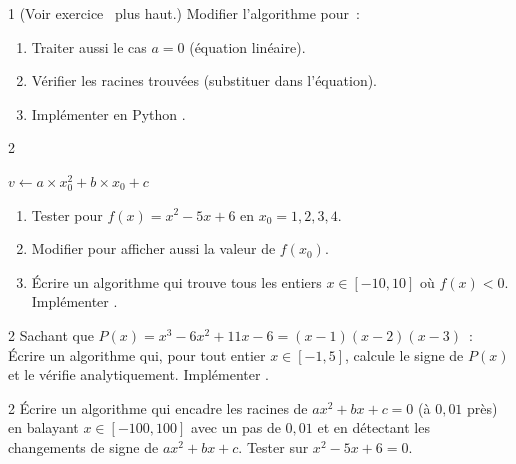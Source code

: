 \begin{exo}[\algo\ Algorithme~: r\'esoudre $ax^2+bx+c=0$ \corrige]{1}
(Voir exercice \logicoalgo\ plus haut.)
Modifier l'algorithme pour~:
\begin{enumerate}
  \item Traiter aussi le cas $a=0$ (\'equation lin\'eaire).
  \item V\'erifier les racines trouv\'ees (substituer dans l'\'equation).
  \item Impl\'ementer en Python \computer.
\end{enumerate}
\end{exo}

\begin{exo}{2}

\begin{algorithm}[H]
\caption{Signe de $f(x)=ax^2+bx+c$}
$v \leftarrow a\times x_0^2 + b\times x_0 + c$\;
\end{algorithm}

\begin{enumerate}
  \item Tester pour $f(x)=x^2-5x+6$ en $x_0=1,2,3,4$.
  \item Modifier pour afficher aussi la valeur de $f(x_0)$.
  \item \'Ecrire un algorithme qui trouve tous les entiers $x\in[-10,10]$
        o\`u $f(x)<0$. Impl\'ementer \computer.
\end{enumerate}
\end{exo}

\begin{exo}{2}
Sachant que $P(x)=x^3-6x^2+11x-6=(x-1)(x-2)(x-3)$~:
\'Ecrire un algorithme qui, pour tout entier $x\in[-1,5]$,
calcule le signe de $P(x)$ et le v\'erifie analytiquement.
Impl\'ementer \computer.
\end{exo}

\begin{exo}{2}
\'Ecrire un algorithme qui encadre les racines de $ax^2+bx+c=0$ (\`a $0{,}01$ pr\`es)
en balayant $x\in[-100,100]$ avec un pas de $0{,}01$ et en d\'etectant les changements
de signe de $ax^2+bx+c$.
Tester sur $x^2-5x+6=0$.
\end{exo}

